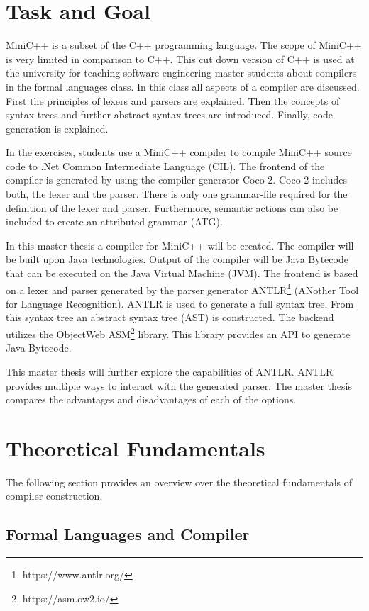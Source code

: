 \section{Task and Goal}

MiniC++ is a subset of the C++ programming language. The scope of MiniC++ is very limited in comparison to C++. This cut down version of C++ is used at the university for teaching software engineering master students about compilers in the formal languages class. In this class all aspects of a compiler are discussed. First the principles of lexers and parsers are explained. Then the concepts of syntax trees and further abstract syntax trees are introduced. Finally, code generation is explained. 

In the exercises, students use a MiniC++ compiler to compile MiniC++ source code to .Net Common Intermediate Language (CIL). The frontend of the compiler is generated by using the compiler generator Coco-2. Coco-2 includes both, the lexer and the parser. There is only one grammar-file required for the definition of the lexer and parser. Furthermore, semantic actions can also be included to create an attributed grammar (ATG). 

In this master thesis a compiler for MiniC++ will be created. The compiler will be built upon Java technologies. Output of the compiler will be Java Bytecode that can be executed on the Java Virtual Machine (JVM). The frontend is based on a lexer and parser generated by the parser generator ANTLR\footnote{https://www.antlr.org/} (ANother Tool for Language Recognition). ANTLR is used to generate a full syntax tree. From this syntax tree an abstract syntax tree (AST) is constructed. The backend utilizes the ObjectWeb ASM\footnote{https://asm.ow2.io/} library. This library provides an API to generate Java Bytecode. 

This master thesis will further explore the capabilities of ANTLR. ANTLR provides multiple ways to interact with the generated parser. The master thesis compares the advantages and disadvantages of each of the options.

\section{Theoretical Fundamentals}

The following section provides an overview over the theoretical fundamentals of compiler construction. 

\subsection{Formal Languages and Compiler}

